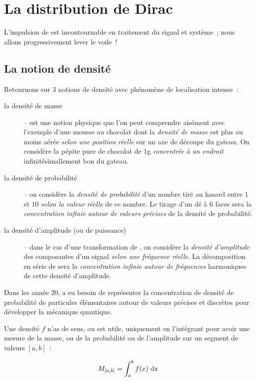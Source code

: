 \chapter{La distribution de Dirac}

L'impulsion de \Dirac{} est incontournable en traitement du signal et système~; nous allons progressivement lever le voile~!

\section{La notion de densité}

Retournons sur 3 notions de densité avec phénomène de localisation intense~:
\begin{description}
\item [la densité de masse] -- est une notion physique que l'on peut comprendre aisément avec l'exemple d'une mousse au chocolat dont la \emph{densité de masse} est plus ou moins aérée \emph{selon une position réelle} sur un axe de découpe du gateau. On considère la pépite pure de chocolat de $1$g \emph{concentrée à un endroit} infinitésimallement bon du gateau.
\item[la densité de probabilité] -- on considère la \emph{densité de probabilité} d'un nombre tiré au hasard entre $1$ et $10$\emph{ selon la valeur réelle} de ce nombre. Le tirage d'un dé à 6 faces sera la \emph{concentration infinie autour de valeurs précises} de la densité de probabilité.
\item[la densité d'amplitude (ou de puissance)] -- dans le cas d'une transformation de \Fourier{}, on considère la \emph{densité d'amplitude} des composantes d'un signal \emph{selon une fréquence réelle}. La décomposition en série de \Fourier{} sera la \emph{concentration infinie autour de fréquences} harmoniques de cette densité d'amplitude.    
\end{description}


Dans les année 20, \Dirac{} a eu besoin de représenter la concentration de densité de probabilité de particules élémentaires autour de valeurs précises et discrètes pour développer la mécanique quantique.

Une densité $f$ n'as de sens, ou est utile, uniquement en l'intègrant pour avoir une \og{} mesure\fg{} de la masse, ou de la probabilité ou de l'amplitude sur un segment de valeurs $[a, b]$~:

\begin{equation}
  \label{eq:densite_mesure}
  M_{[a, b]} = \int_a^b f(x)\;\mathrm{d{x}}
\end{equation}

